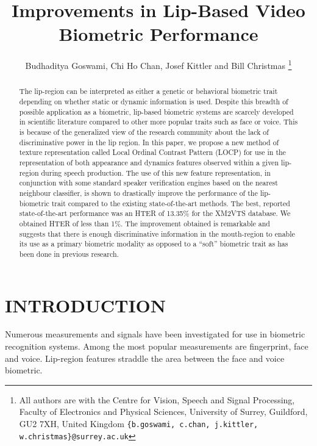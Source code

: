 \documentclass[a4paper, 10pt, conference]{ieeeconf}      %
\title{\LARGE \bf
Improvements in Lip-Based Video Biometric Performance }
\author{Budhaditya Goswami, Chi Ho Chan, Josef Kittler and Bill Christmas%
\thanks{All authors are with the Centre for Vision, Speech and Signal Processing, Faculty of Electronics and Physical Sciences, University of Surrey, Guildford, GU2 7XH, United Kingdom {\tt\small \{b.goswami, c.chan, j.kittler, w.christmas\}@surrey.ac.uk}}%
}
\begin{document}
\maketitle
\thispagestyle{empty}
\pagestyle{empty}
\begin{abstract}
The lip-region can be interpreted as either a genetic or behavioral biometric trait depending on whether static or dynamic information is used. Despite this breadth of possible application as a biometric, lip-based biometric systems are scarcely developed in scientific literature compared to other more popular traits such as face or voice. This is because of the generalized view of the research community about the lack of discriminative power in the lip region. In this paper, we propose a new method of texture representation called Local Ordinal Contrast Pattern (LOCP) for use in the representation of both appearance and dynamics features observed within a given lip-region during speech production. The use of this new feature representation, in conjunction with some standard speaker verification engines based on the nearest neighbour classifier, is shown to drastically improve the performance of the lip-biometric trait compared to the existing state-of-the-art methods. The best, reported state-of-the-art performance was an HTER of 13.35\% for the XM2VTS database. We obtained HTER of less than 1\%. The improvement obtained is remarkable and suggests that there is enough discriminative information in the mouth-region to enable its use as a primary biometric modality as opposed to a ``soft'' biometric trait as has been done in previous research. 
\end{abstract}


\section{INTRODUCTION}
Numerous measurements and signals have been investigated for use in biometric recognition systems. 
Among the most popular measurements are fingerprint, face and voice. 
Lip-region features straddle the area between the face and voice biometric. 
\end{document}
